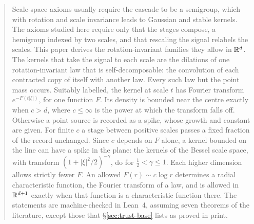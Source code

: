 \begin{abstract}
Scale-space axioms usually require the cascade to be a semigroup, which with
rotation and scale invariance leads to Gaussian and stable kernels. The axioms studied here require
only that the stages compose, a hemigroup indexed by two scales, and that rescaling the signal relabels the scales. This paper derives the
rotation-invariant families they allow in $\RR^d$. The kernels that take the signal to each
scale are the dilations of one rotation-invariant law that is self-decomposable: the convolution
of each contracted copy of itself with another law. Every such law but the point mass occurs.
Suitably labelled, the kernel at scale $t$ has Fourier transform $e^{-F(t|\xi|)}$, for one
function $F$. Its density is bounded near the centre exactly when $c > d$, where
$c \le \infty$ is the power at which the transform falls off. Otherwise a point source
is recorded as a spike, whose growth and constant are given. For finite $c$ a
stage between positive scales passes a fixed fraction of the record unchanged. Since $c$
depends on $F$ alone, a kernel bounded on the
line can have a spike in the plane: the \Matern{} kernels of the Bessel scale space,
with transform $(1 + |\xi|^2/2)^{-\gamma}$, do for
$\tfrac12 < \gamma \le 1$. Each higher
dimension allows strictly fewer $F$. An allowed $F(r) \sim c\log r$ determines a radial
characteristic function, the Fourier transform of a law, and is allowed in $\RR^{d+1}$
exactly when that function is a characteristic function there. The statements are
machine-checked in
Lean~4, assuming seven theorems of the literature, except those that \S\ref{sec:trust-base}
lists as proved in print.
\end{abstract}

